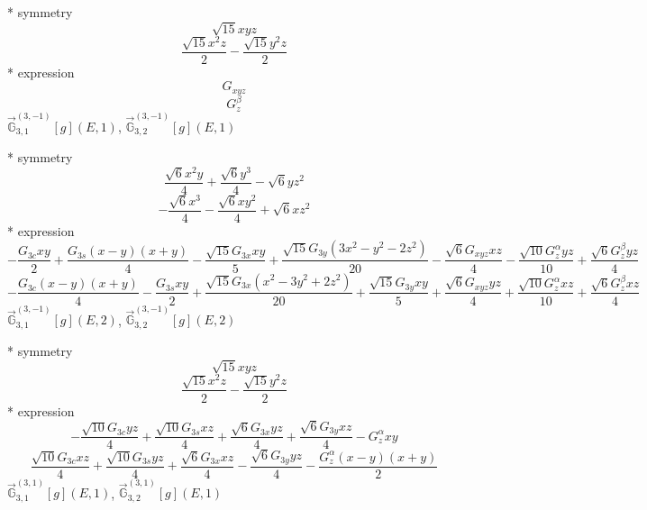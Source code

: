 \documentclass[fleqn,8pt]{jsarticle}
\begin{document}
\noindent\quad ** symmetry
\begin{dmath*}
\sqrt{15} x y z
\end{dmath*}
\begin{dmath*}
\frac{\sqrt{15} x^{2} z}{2} - \frac{\sqrt{15} y^{2} z}{2}
\end{dmath*}
\noindent\quad ** expression
\begin{dmath*}
G_{xyz}
\end{dmath*}
\begin{dmath*}
G_{z}^{\beta}
\end{dmath*}
\noindent\quad $\vec{\mathbb{G}}_{3,1}^{(3,-1)}[g](E,1)$, $\vec{\mathbb{G}}_{3,2}^{(3,-1)}[g](E,1)$

\noindent\quad ** symmetry
\begin{dmath*}
\frac{\sqrt{6} x^{2} y}{4} + \frac{\sqrt{6} y^{3}}{4} - \sqrt{6} y z^{2}
\end{dmath*}
\begin{dmath*}
- \frac{\sqrt{6} x^{3}}{4} - \frac{\sqrt{6} x y^{2}}{4} + \sqrt{6} x z^{2}
\end{dmath*}
\noindent\quad ** expression
\begin{dmath*}
- \frac{G_{3c} x y}{2} + \frac{G_{3s} \left(x - y\right) \left(x + y\right)}{4} - \frac{\sqrt{15} G_{3x} x y}{5} + \frac{\sqrt{15} G_{3y} \left(3 x^{2} - y^{2} - 2 z^{2}\right)}{20} - \frac{\sqrt{6} G_{xyz} x z}{4} - \frac{\sqrt{10} G_{z}^{\alpha} y z}{10} + \frac{\sqrt{6} G_{z}^{\beta} y z}{4}
\end{dmath*}
\begin{dmath*}
- \frac{G_{3c} \left(x - y\right) \left(x + y\right)}{4} - \frac{G_{3s} x y}{2} + \frac{\sqrt{15} G_{3x} \left(x^{2} - 3 y^{2} + 2 z^{2}\right)}{20} + \frac{\sqrt{15} G_{3y} x y}{5} + \frac{\sqrt{6} G_{xyz} y z}{4} + \frac{\sqrt{10} G_{z}^{\alpha} x z}{10} + \frac{\sqrt{6} G_{z}^{\beta} x z}{4}
\end{dmath*}
\noindent\quad $\vec{\mathbb{G}}_{3,1}^{(3,-1)}[g](E,2)$, $\vec{\mathbb{G}}_{3,2}^{(3,-1)}[g](E,2)$

\noindent\quad ** symmetry
\begin{dmath*}
\sqrt{15} x y z
\end{dmath*}
\begin{dmath*}
\frac{\sqrt{15} x^{2} z}{2} - \frac{\sqrt{15} y^{2} z}{2}
\end{dmath*}
\noindent\quad ** expression
\begin{dmath*}
- \frac{\sqrt{10} G_{3c} y z}{4} + \frac{\sqrt{10} G_{3s} x z}{4} + \frac{\sqrt{6} G_{3x} y z}{4} + \frac{\sqrt{6} G_{3y} x z}{4} - G_{z}^{\alpha} x y
\end{dmath*}
\begin{dmath*}
\frac{\sqrt{10} G_{3c} x z}{4} + \frac{\sqrt{10} G_{3s} y z}{4} + \frac{\sqrt{6} G_{3x} x z}{4} - \frac{\sqrt{6} G_{3y} y z}{4} - \frac{G_{z}^{\alpha} \left(x - y\right) \left(x + y\right)}{2}
\end{dmath*}
\noindent\quad $\vec{\mathbb{G}}_{3,1}^{(3,1)}[g](E,1)$, $\vec{\mathbb{G}}_{3,2}^{(3,1)}[g](E,1)$
\end{document}
